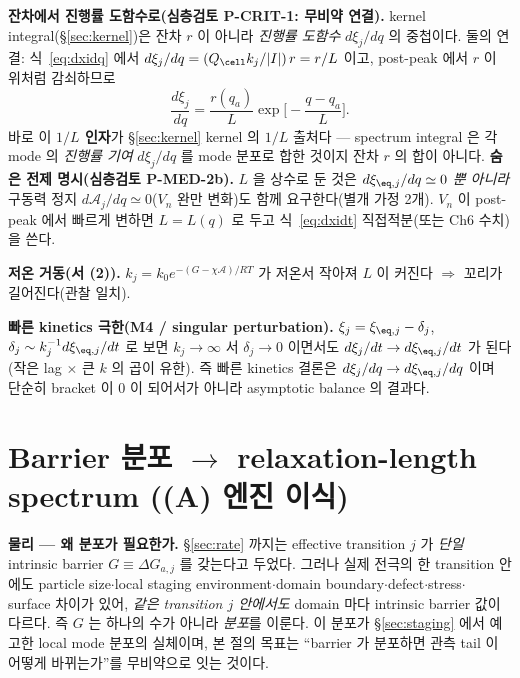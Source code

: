 \textbf{잔차에서 진행률 도함수로(심층검토 P-CRIT-1: 무비약 연결).} kernel integral(\S\ref{sec:kernel})은
잔차 $r$ 이 아니라 \emph{진행률 도함수} $d\xi_j/dq$ 의 중첩이다. 둘의 연결: 식~\eqref{eq:dxidq} 에서
$d\xi_j/dq=(Q_\cell k_j/|I|)\,r=r/L$ 이고, post-peak 에서 $r$ 이 위처럼 감쇠하므로
\begin{equation}
\frac{d\xi_j}{dq}=\frac{r(q_a)}{L}\exp\!\Big[-\frac{q-q_a}{L}\Big].
\label{eq:single_dxidq}
\end{equation}
바로 이 \textbf{$1/L$ 인자}가 \S\ref{sec:kernel} kernel 의 $1/L$ 출처다 — spectrum integral 은 각 mode 의
\emph{진행률 기여} $d\xi_j/dq$ 를 mode 분포로 합한 것이지 잔차 $r$ 의 합이 아니다.
\textbf{숨은 전제 명시(심층검토 P-MED-2b).} $L$ 을 상수로 둔 것은 $d\xi_{\eq,j}/dq\simeq0$ \emph{뿐 아니라}
구동력 정지 $d\mathcal A_j/dq\simeq0$($V_n$ 완만 변화)도 함께 요구한다(별개 가정 2개). $V_n$ 이 post-peak
에서 빠르게 변하면 $L=L(q)$ 로 두고 식~\eqref{eq:dxidt} 직접적분(또는 Ch6 수치)을 쓴다.

\textbf{저온 거동(서 (2)).} $k_j=k_0e^{-(G-\chi\mathcal A)/RT}$ 가 저온서 작아져 $L$ 이 커진다
$\Rightarrow$ 꼬리가 길어진다(관찰 일치).

\textbf{빠른 kinetics 극한(M4 / singular perturbation).} $\xi_j=\xi_{\eq,j}-\delta_j$,
$\delta_j\sim k_j^{-1}d\xi_{\eq,j}/dt$ 로 보면 $k_j\to\infty$ 서 $\delta_j\to0$ 이면서도
$d\xi_j/dt\to d\xi_{\eq,j}/dt$ 가 된다(작은 lag $\times$ 큰 $k$ 의 곱이 유한). 즉 빠른 kinetics 결론은
$d\xi_j/dq\to d\xi_{\eq,j}/dq$ 이며 단순히 bracket 이 0 이 되어서가 아니라 asymptotic balance 의 결과다.

\section{Barrier 분포 $\to$ relaxation-length spectrum ((A) 엔진 이식)}\label{sec:spectrum}
\textbf{물리 — 왜 분포가 필요한가.} \S\ref{sec:rate} 까지는 effective transition $j$ 가 \emph{단일}
intrinsic barrier $G\equiv\Delta G_{a,j}$ 를 갖는다고 두었다. 그러나 실제 전극의 한 transition 안에도
particle size$\cdot$local staging environment$\cdot$domain boundary$\cdot$defect$\cdot$stress$\cdot$
surface 차이가 있어, \emph{같은 transition $j$ 안에서도} domain 마다 intrinsic barrier 값이 다르다. 즉
$G$ 는 하나의 수가 아니라 \emph{분포}를 이룬다. 이 분포가 \S\ref{sec:staging} 에서 예고한 local mode
분포의 실체이며, 본 절의 목표는 ``barrier 가 분포하면 관측 tail 이 어떻게 바뀌는가''를 무비약으로 잇는 것이다.

